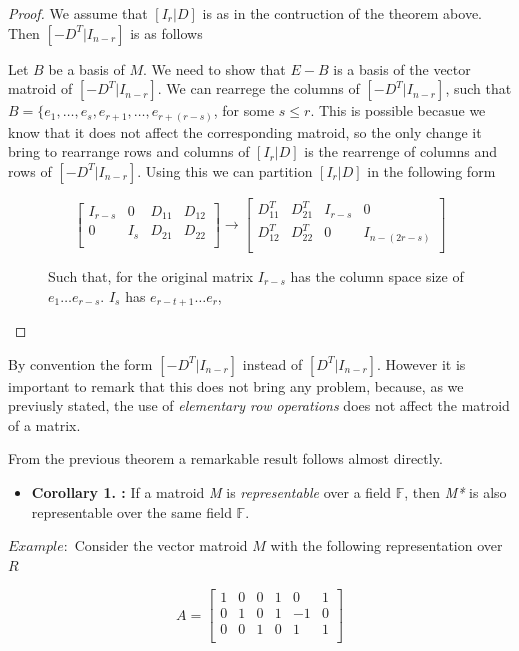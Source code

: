\begin{proof}
    We assume that $[I_r|D]$ is as in the contruction of the theorem above. Then $[-D^T|I_{n-r}]$ is as follows


    Let $B$ be a basis of $M$. We need to show that $E-B$ is a basis of the vector matroid of $[-D^T|I_{n-r}]$. We can rearrege the columns of $[-D^T|I_{n-r}]$, such that $B=\{e_1,\dots,e_s, e_{r+1}, \dots , e_{r+(r-s)}$, for some $s \leq r$. This is possible becasue we know that it does not affect the corresponding matroid, so the only change it bring to rearrange rows and columns of $[I_r|D]$ is the rearrenge of columns and rows of $[-D^T|I_{n-r}]$. 
    Using this we can partition $[I_r|D]$ in the following form

    \begin{figure}
        $$\begin{bmatrix}
    I_{r-s} & 0 & D_11 & D_12\\
    0 & I_s & D_21 & D_22\\
    \end{bmatrix}
  \rightarrow
  \begin{bmatrix}
    D_11^T & D_21^T & I_{r-s} & 0\\
    D_12^T & D_22^T & 0 & I_{n-(2r-s)}\\
    \end{bmatrix}$$

    Such that, for the original matrix $I_{r-s}$ has the column space size of $e_1 \dots e_{r-s}$. $I_s$ has $e_{r-t+1} \dots e_r$, 

    
\end{figure}
    
\end{proof}

By convention the form $[−D^T |I_{n−r}]$ instead of $[D^T |I_{n−r}]$. However it is important to remark that this does not bring any problem, because, as we previusly stated, the use of \textit{elementary row operations} does not affect the matroid of a matrix. 

From the previous theorem a remarkable result follows almost directly. 
\begin{itemize}
    \item  \textbf{Corollary 1. :} If a matroid \textit{M} is \textit{representable} over a field $\mathbb{F}$, then \textit{M*} is also representable over the same field $\mathbb{F}$.
\end{itemize}


$Example:$ Consider the vector matroid $M$ with the following representation over $R$
        \begin{figure}[H]
            $$A = \begin{bmatrix}
                1 & 0 & 0 & 1 & 0 & 1 \\
                0 & 1 & 0 & 1 & -1 & 0 \\
                0 & 0 & 1 & 0 & 1 & 1 \\
            \end{bmatrix}$$
        \end{figure}
        
